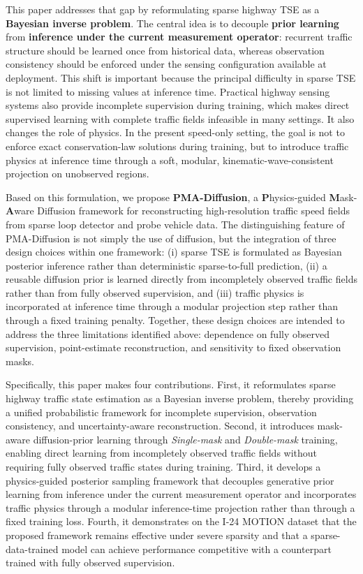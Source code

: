 \documentclass[a4paper,fleqn]{cas-sc}
\numberwithin{equation}{section}
\begin{document}
This paper addresses that gap by reformulating sparse highway TSE as a \textbf{Bayesian inverse problem}. The central idea is to decouple \textbf{prior learning} from \textbf{inference under the current measurement operator}: recurrent traffic structure should be learned once from historical data, whereas observation consistency should be enforced under the sensing configuration available at deployment. This shift is important because the principal difficulty in sparse TSE is not limited to missing values at inference time. Practical highway sensing systems also provide incomplete supervision during training, which makes direct supervised learning with complete traffic fields infeasible in many settings. It also changes the role of physics. In the present speed-only setting, the goal is not to enforce exact conservation-law solutions during training, but to introduce traffic physics at inference time through a soft, modular, kinematic-wave-consistent projection on unobserved regions.

Based on this formulation, we propose \textbf{PMA-Diffusion}, a \textbf{P}hysics-guided \textbf{M}ask-\textbf{A}ware Diffusion framework for reconstructing high-resolution traffic speed fields from sparse loop detector and probe vehicle data. The distinguishing feature of PMA-Diffusion is not simply the use of diffusion, but the integration of three design choices within one framework: (i) sparse TSE is formulated as Bayesian posterior inference rather than deterministic sparse-to-full prediction, (ii) a reusable diffusion prior is learned directly from incompletely observed traffic fields rather than from fully observed supervision, and (iii) traffic physics is incorporated at inference time through a modular projection step rather than through a fixed training penalty. Together, these design choices are intended to address the three limitations identified above: dependence on fully observed supervision, point-estimate reconstruction, and sensitivity to fixed observation masks.

Specifically, this paper makes four contributions. First, it reformulates sparse highway traffic state estimation as a Bayesian inverse problem, thereby providing a unified probabilistic framework for incomplete supervision, observation consistency, and uncertainty-aware reconstruction. Second, it introduces mask-aware diffusion-prior learning through \textit{Single-mask} and \textit{Double-mask} training, enabling direct learning from incompletely observed traffic fields without requiring fully observed traffic states during training. Third, it develops a physics-guided posterior sampling framework that decouples generative prior learning from inference under the current measurement operator and incorporates traffic physics through a modular inference-time projection rather than through a fixed training loss. Fourth, it demonstrates on the I-24 MOTION dataset that the proposed framework remains effective under severe sparsity and that a sparse-data-trained model can achieve performance competitive with a counterpart trained with fully observed supervision.
\end{document}
